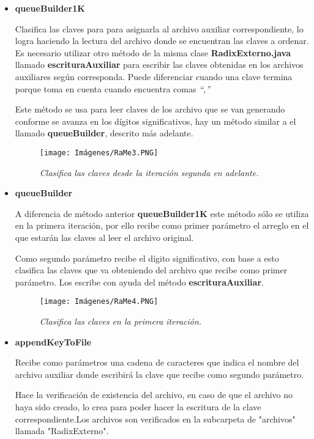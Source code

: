\documentclass[letterpaper,12pt]{extarticle}
\begin{document}
\begin{itemize}
    \item\textbf{queueBuilder1K}
    
    Clasifica las claves para para asignarla al archivo auxiliar correspondiente, lo logra haciendo la lectura del archivo donde se encuentran las claves a ordenar. Es necesario utilizar otro método de la misma clase \textbf {RadixExterno.java} llamado \textbf {escrituraAuxiliar} para escribir las claves obtenidas en los archivos auxiliares según corresponda. Puede diferenciar cuando una clave termina porque toma en cuenta cuando encuentra comas \textit {“,”}
    
    Este método se usa para leer claves de los archivo que se van generando conforme se avanza en los dígitos significativos, hay un método similar a el llamado \textbf {queueBuilder}, descrito más adelante.
    
    \pagebreak
    
    \begin{figure}[h!]
    \centering
    \texttt{[image: Imágenes/RaMe3.PNG]}
    \caption{\textit{Clasifica las claves desde la iteración segunda en adelante.}}
    \label{fig:RaMe3}
    \end{figure}
    
    \item\textbf{queueBuilder}
    
    A diferencia de método anterior \textbf {queueBuilder1K} este método sólo se utiliza en la primera iteración, por ello recibe como primer parámetro el arreglo en  el que estarán las claves al leer el archivo original.

    Como segundo parámetro recibe el dígito significativo, con base a esto clasifica las claves que va obteniendo del archivo que recibe como primer parámetro. Los escribe con ayuda del método \textbf {escrituraAuxiliar}.
    
    \begin{figure}[h!]
    \centering
    \texttt{[image: Imágenes/RaMe4.PNG]}
    \caption{\textit{Clasifica las claves en la primera iteración.}}
    \label{fig:RaMe4}
    \end{figure}

     \item\textbf{appendKeyToFile}
    
    Recibe como parámetros una cadena de caracteres que indica el nombre del archivo auxiliar donde escribirá la clave que recibe como segundo parámetro.

    Hace la verificación de existencia del archivo, en caso de que el archivo no haya sido creado, lo crea para poder hacer la escritura de la clave correspondiente.Los archivos son verificados en la subcarpeta de "archivos" llamada "RadixExterno".


\end{itemize}
\end{document}
